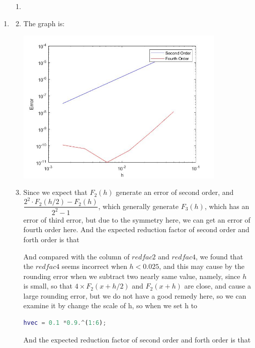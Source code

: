 \documentclass{article}
\begin{document}
\begin{enumerate}
\item

 
\begin{enumerate}
\item
\begin{small}
 
 \end{small}
 \item
 The graph is:
 \begin{center}
  \includegraphics[width=10cm]{24.jpg} 
 \end{center}
 
 \item
 Since we expect that $F_2(h)$ generate an error of second order, and $\dfrac{2^2\cdot F_2(h/2) - F_2(h)}{2^2-1}$, which generally generate $F_3(h)$, which has an error of third error, but due to the symmetry here, we can get an error of fourth order here. And the expected reduction factor of second order and forth order is that 
 
 
 
 And compared with the column of $redfac2$ and $redfac4$, we found that the $redfac4$ seems incorrect when $h<0.025$, and this may cause by the rounding error when we subtract two nearly same value, namely, since $h$ is small, so that $4\times F_2(x+h/2)$ and $F_2(x+h)$ are close, and cause a large rounding error, but we do not have a good remedy here, so we can examine it by change the scale of h, so when we set h to

 \begin{lstlisting}[language=Matlab,frame =none]
 hvec = 0.1 *0.9.^(1:6);
 \end{lstlisting} 
 And the expected reduction factor of second order and forth order is that 
 

\end{enumerate}
\end{enumerate}
\end{document}
